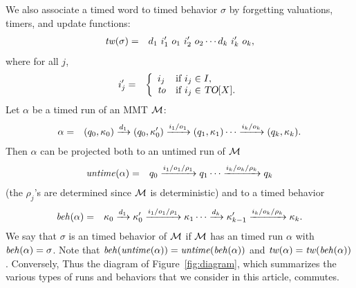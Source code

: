 We also associate a timed word to timed behavior $\sigma$ by forgetting valuations, timers, and update functions:
\begin{eqnarray*}
\mathit{tw}(\sigma) & = & d_ 1 ~ i'_1 ~ o_1 ~ i'_2 ~ o_2 \cdots d_k ~ i'_k ~ o_k, 
\end{eqnarray*} 
where for all  $j$,
\begin{eqnarray*}
i'_j  & = &  \left\{ \begin{array}{ll}
i_j & \mbox{if } i_j \in I,\\
\mathit{to} & \mbox{if } i_j \in \mbox{\sl TO}[X].
\end{array} \right.
\end{eqnarray*}
Let $\alpha$ be a timed run of an MMT ${\mathcal M}$: 
\begin{eqnarray*}
\alpha & = & (q_0, \kappa_0) \xrightarrow{d_1} (q_0, \kappa'_0) \xrightarrow{i_1/o_1} (q_1, \kappa_1)  \cdots
 \xrightarrow{i_k/o_k} (q_k, \kappa_k).
\end{eqnarray*}
Then $\alpha$ can be projected both to an untimed run of ${\mathcal M}$
\begin{eqnarray*}
\mathit{untime} (\alpha) & = & q_0 \xrightarrow{i_1/o_1/\rho_1} q_1  \cdots \xrightarrow{i_k/o_k/\rho_k} q_k
\end{eqnarray*}
(the $\rho_j$'s are determined since ${\mathcal M}$ is deterministic) and to a timed behavior
\begin{eqnarray*}
\mathit{beh}(\alpha) & = & \kappa_0 \xrightarrow{d_1} \kappa'_0 \xrightarrow{i_1/o_1/\rho_1} \kappa_1  \cdots
\xrightarrow{d_k} \kappa'_{k-1} \xrightarrow{i_k/o_k/\rho_k} \kappa_{k}.
\end{eqnarray*}
\iflong
We say that $\sigma$ is an timed behavior of ${\mathcal M}$ if ${\mathcal M}$ has an timed run $\alpha$ with $\mathit{beh}(\alpha) = \sigma$.
\fi
Note that $\mathit{beh}(\mathit{untime}(\alpha))=\mathit{untime}(\mathit{beh}(\alpha))$ and $\mathit{tw}(\alpha) = \mathit{tw}(\mathit{beh}(\alpha))$.
\ifshort
Conversely,
\else
Thus the diagram of Figure~\ref{fig:diagram}, which summarizes the various types of runs and behaviors that we consider
in this article, commutes.
